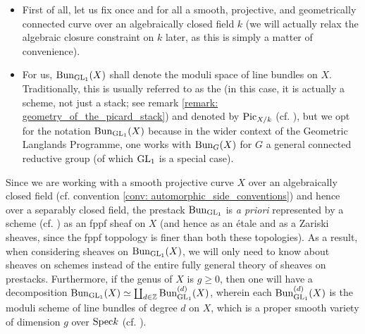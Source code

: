             \begin{convention} \label{conv: automorphic_side_conventions}
                \noindent
                \begin{itemize}
                    \item First of all, let us fix once and for all a smooth, projective, and geometrically connected curve over an algebraically closed field $k$ (we will actually relax the algebraic closure constraint on $k$ later, as this is simply a matter of convenience).
                    \item For us, $\mathrm{Bun}_{\operatorname{GL}_1}(X)$ shall denote the moduli space of line bundles on $X$. Traditionally, this is usually referred to as the  (in this case, it is actually a scheme, not just a stack; see remark \ref{remark: geometry_of_the_picard_stack}) and denoted by $\mathrm{Pic}_{X/k}$ (cf. \cite[\href{https://stacks.math.columbia.edu/tag/0372}{Tag 0372}]{stacks}), but we opt for the notation $\mathrm{Bun}_{\operatorname{GL}_1}(X)$ because in the wider context of the Geometric Langlands Programme, one works with $\mathrm{Bun}_G(X)$ for $G$ a general connected reductive group (of which $\operatorname{GL}_1$ is a special case). 
                \end{itemize}
            \end{convention}
            \begin{remark} \label{remark: geometry_of_the_picard_stack}
                Since we are working with a smooth projective curve $X$ over an algebraically closed field (cf. convention \ref{conv: automorphic_side_conventions}) and hence over a separably closed field, the prestack $\mathrm{Bun}_{\operatorname{GL}_1}$ is \textit{a priori} represented by a scheme (cf. \cite[\href{https://stacks.math.columbia.edu/tag/0B9Z}{Tag 0B9Z}]{stacks}) as an fppf sheaf on $X$ (and hence as an \'etale and as a Zariski sheaves, since the fppf toppology is finer than both these topologies). As a result, when considering sheaves on $\mathrm{Bun}_{\operatorname{GL}_1}(X)$, we will only need to know about sheaves on schemes instead of the entire fully general theory of sheaves on prestacks. Furthermore, if the genus of $X$ is $g \geq 0$, then one will have a decomposition $\mathrm{Bun}_{\operatorname{GL}_1}(X) \simeq \coprod_{d \in \mathbb{Z}} \mathrm{Bun}_{\operatorname{GL}_1}^{(d)}(X)$, wherein each $\mathrm{Bun}_{\operatorname{GL}_1}^{(d)}(X)$ is the moduli scheme of line bundles of degree $d$  on $X$, which is a proper smooth variety of dimension $g$ over $\mathrm{Spec} k$ (cf. \cite[\href{https://stacks.math.columbia.edu/tag/0BA0}{Tag 0BA0}]{stacks}).
            \end{remark}
            

